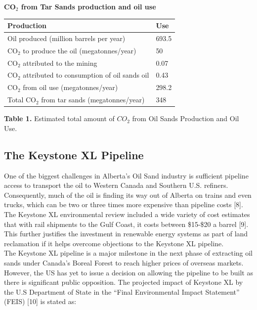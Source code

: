 \documentclass[12pt]{article}
\begin{document}
\begin{center}
{\bf CO$_2$ from Tar Sands production and oil use} \\
\begin{tabular}{|l|l|}
\hline
\cellcolor[gray]{0.8} {\bf Production} & \cellcolor[gray]{0.8} {\bf Use} \\
\hline
Oil produced (million barrels per year) & 693.5\\
\hline
CO$_2$ to produce the oil (megatonnes/year) & 50 \\
\hline
\hspace{8.5em} CO$_2$ attributed to the mining & 0.07 \\
\hline
\hspace{1em} CO$_2$ attributed to consumption of oil sands oil & 0.43\\
\hline
CO$_2$ from oil use (megatonnes/year)  & 298.2 \\
\hline  
Total CO$_2$ from tar sands (megatonnes/year) & 348 \\
\hline
\end{tabular}
\end{center}
\begin{center}
{\bf Table 1.} Estimated total amount of $CO_2$ from Oil Sands Production and Oil Use.
\end{center}

\subsection{The Keystone XL Pipeline}
One of the biggest challenges in Alberta's Oil Sand industry is sufficient pipeline access to transport the oil to Western Canada and Southern U.S. refiners. Consequently, much of the oil is finding its way out of Alberta on trains and even trucks, which can be two or three times more expensive than pipeline costs [8]. The Keystone XL environmental review included a wide variety of cost estimates that with rail shipments to the Gulf Coast, it costs between \$15-\$20 a barrel [9]. This further justifies the investment in renewable energy systems as part of land reclamation if it helps overcome objections to the Keystone XL pipeline.\\
The Keystone XL pipeline is a major milestone in the next phase of extracting oil sands under Canada's Boreal Forest to reach higher prices of overseas markets. However, the US has yet to issue a decision on allowing the pipeline to be built as there is significant public opposition.  The projected impact of Keystone XL by the U.S Department of State in the “Final Environmental Impact Statement” (FEIS) [10] is stated as:
\end{document}
